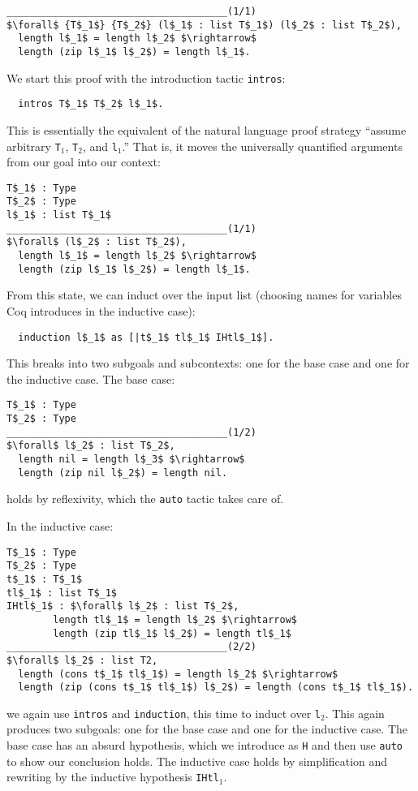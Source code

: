 \begin{lstlisting}
______________________________________(1/1)
$\forall$ {T$_1$} {T$_2$} (l$_1$ : list T$_1$) (l$_2$ : list T$_2$),
  length l$_1$ = length l$_2$ $\rightarrow$
  length (zip l$_1$ l$_2$) = length l$_1$.
\end{lstlisting}
We start this proof with the introduction tactic \lstinline{intros}:

\begin{lstlisting}
  intros T$_1$ T$_2$ l$_1$.
\end{lstlisting}
This is essentially the equivalent of the natural language proof strategy ``assume arbitrary \lstinline{T}$_1$, \lstinline{T}$_2$, and \lstinline{l}$_1$.''
That is, it moves the universally quantified arguments from our goal into our context:

\begin{lstlisting}
T$_1$ : Type
T$_2$ : Type
l$_1$ : list T$_1$
______________________________________(1/1)
$\forall$ (l$_2$ : list T$_2$),
  length l$_1$ = length l$_2$ $\rightarrow$
  length (zip l$_1$ l$_2$) = length l$_1$.
\end{lstlisting}
From this state, we can induct over the input list (choosing names for variables Coq introduces in the inductive case):

\begin{lstlisting}
  induction l$_1$ as [|t$_1$ tl$_1$ IHtl$_1$].
\end{lstlisting}
This breaks into two subgoals and subcontexts: one for the base case and one for the inductive case.
The base case:
\begin{lstlisting}
T$_1$ : Type
T$_2$ : Type
______________________________________(1/2)
$\forall$ l$_2$ : list T$_2$,
  length nil = length l$_3$ $\rightarrow$
  length (zip nil l$_2$) = length nil.
\end{lstlisting}
holds by reflexivity, which the \lstinline{auto} tactic takes care of.

In the inductive case:

\begin{lstlisting}
T$_1$ : Type
T$_2$ : Type
t$_1$ : T$_1$
tl$_1$ : list T$_1$
IHtl$_1$ : $\forall$ l$_2$ : list T$_2$,
        length tl$_1$ = length l$_2$ $\rightarrow$
        length (zip tl$_1$ l$_2$) = length tl$_1$
______________________________________(2/2)
$\forall$ l$_2$ : list T2,
  length (cons t$_1$ tl$_1$) = length l$_2$ $\rightarrow$
  length (zip (cons t$_1$ tl$_1$) l$_2$) = length (cons t$_1$ tl$_1$).
\end{lstlisting}
we again use \lstinline{intros} and \lstinline{induction}, this time to induct over \lstinline{l}$_2$.
This again produces two subgoals: one for the base case and one for the inductive case.
The base case has an absurd hypothesis, which we introduce as \lstinline{H} and then use \lstinline{auto} to show our conclusion holds.
The inductive case holds by simplification and rewriting by the inductive hypothesis \lstinline{IHtl}$_1$.

